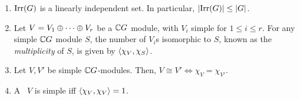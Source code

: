 \begin{boxproposition} \label{Ch2:Prop:Bhv_Irred_Char}
    \hfill
    \begin{enumerate}[label = \normalfont \arabic*., noitemsep]
        \item $\operatorname{Irr}\!\left( G \right)$ is a linearly independent set. In particular, $\left\lvert \operatorname{Irr}\!\left( G \right) \right\rvert \leq \left\lvert G \right\rvert$.
        
        \item Let $V = V_1 \oplus \cdots \oplus V_r$ be a $\mathbb{C} G$ module, with $V_i$ simple for $1 \leq i \leq r$. For any simple $\mathbb{C} G$ module $S$, the number of $V_i$s isomorphic to $S$, known as the \emph{multiplicity} of $S$, is given by $\left\langle \chi_V, \chi_S \right\rangle$.
        
        \item Let $V, V'$ be simple $\mathbb{C} G$-modules. Then, $V \cong V' \iff \chi_V = \chi_{V'}$.
        
        \item A \CGM\ $V$ is simple iff $\left\langle \chi_V, \chi_V \right\rangle = 1$.
    \end{enumerate}
\end{boxproposition}

